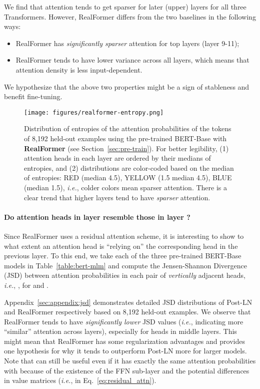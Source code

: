 \documentclass[11pt,a4paper]{article}
\begin{document}
 We find that attention tends to get sparser for later (upper) layers for all three Transformers. However, RealFormer differs from the two baselines in the following ways: 
\begin{itemize}
    \item RealFormer has \emph{significantly sparser} attention for top layers (layer 9-11);
    \item RealFormer tends to have lower variance across all layers, which means that attention density is less input-dependent.
\end{itemize}
We hypothesize that the above two properties might be a sign of stableness and benefit fine-tuning.

\begin{figure*}[!t]
\centering
\texttt{[image: figures/realformer-entropy.png]}
\caption{Distribution of entropies of the attention probabilities of the tokens of 8,192 held-out examples using the pre-trained BERT-Base with \textbf{RealFormer} (see Section~\ref{sec:pre-train}). For better legibility, (1) attention heads in each layer are ordered by their medians of entropies, and (2) distributions are color-coded based on the median of entropies: RED (median  4.5), YELLOW (1.5  median  4.5), BLUE (median  1.5), \emph{i.e.}, colder colors mean sparser attention. There is a clear trend that higher layers tend to have \emph{sparser} attention.}
\label{fig:realformer-entropy}
\end{figure*}


\paragraph{Do attention heads in layer  resemble those in layer ?}
Since RealFormer uses a residual attention scheme, it is interesting to show to what extent an attention head is ``relying on'' the corresponding head in the previous layer.
To this end, we take each of the three pre-trained BERT-Base models in Table~\ref{table:bert-mlm} and compute the Jensen-Shannon Divergence (JSD) between attention probabilities in each pair of \emph{vertically} adjacent heads, \emph{i.e.}, , for  and .

Appendix~\ref{sec:appendix:jsd} demonstrates detailed JSD distributions of Post-LN
and RealFormer respectively based on 8,192 held-out examples. We observe that RealFormer tends to have \emph{significantly lower} JSD values (\emph{i.e.}, indicating more ``similar'' attention across layers), especially for heads in middle layers. This might mean that RealFormer has some regularization advantages and provides one hypothesis for why it tends to outperform Post-LN more for larger models. Note that  can still be useful even if it has exactly the same attention probabilities with  because of the existence of the FFN sub-layer and the potential differences in value matrices (\emph{i.e.},  in Eq.~\ref{eq:residual_attn}).
\end{document}
